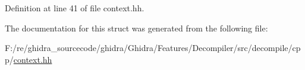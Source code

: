 Definition at line 41 of file context.\+hh.



The documentation for this struct was generated from the following file\+:\begin{DoxyCompactItemize}
\item 
F\+:/re/ghidra\+\_\+sourcecode/ghidra/\+Ghidra/\+Features/\+Decompiler/src/decompile/cpp/\mbox{\hyperlink{context_8hh}{context.\+hh}}\end{DoxyCompactItemize}
